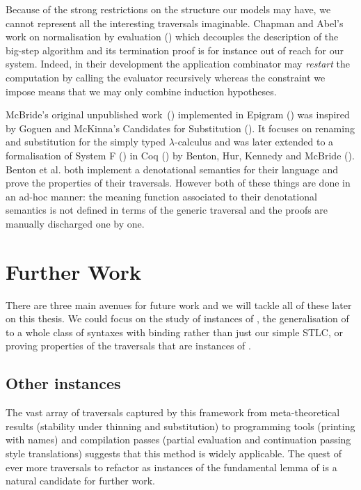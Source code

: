 Because of the strong restrictions on the structure our models may have,
we cannot represent all the interesting traversals imaginable. Chapman and
Abel's work on normalisation by evaluation
(\citeyear{chapman2009type,abel2014normalization})
which decouples the description of the big-step algorithm and its termination
proof is for instance out of reach for our system. Indeed, in their development
the application combinator may \emph{restart} the computation by calling the
evaluator recursively whereas the  constraint we impose means
that we may only combine induction hypotheses.

McBride's original unpublished work~(\citeyear{mcbride2005type}) implemented
in Epigram (\cite{mcbride2004view}) was inspired by Goguen and McKinna's
Candidates for Substitution (\citeyear{goguen1997candidates}). It focuses on
renaming and substitution for the simply typed $λ$-calculus and was later
extended to a formalisation of System F (\cite{girard1972interpretation})
in Coq (\cite{Coq:manual}) by Benton, Hur, Kennedy and McBride
(\citeyear{benton2012strongly}).
Benton et al. both implement a denotational semantics for their language
and prove the properties of their traversals. However both of these things
are done in an ad-hoc manner: the meaning function associated to their
denotational semantics is not defined in terms of the generic traversal
and the proofs are manually discharged one by one.

\section{Further Work}

There are three main avenues for future work and we will tackle all of these
later on this thesis. We could focus on the study of instances of ,
the generalisation of  to a whole class of syntaxes with binding
rather than just our simple STLC, or proving properties of the traversals that
are instances of .

\subsection{Other instances}

The vast array of traversals captured by this framework from meta-theoretical
results (stability under thinning and substitution) to programming tools
(printing with names) and compilation passes (partial evaluation and
continuation passing style translations) suggests that this method is widely
applicable. The quest of ever more traversals to refactor as instances of the
fundamental lemma of  is a natural candidate for further work.

